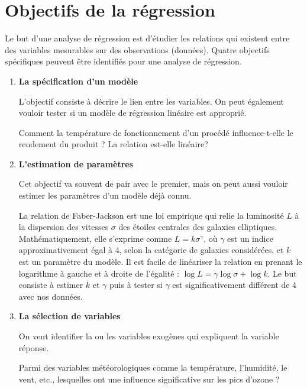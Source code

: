 \section{Objectifs de la régression}

Le but d'une analyse de régression est d'étudier les relations qui existent entre des variables mesurables sur des observations (données). Quatre objectifs spécifiques peuvent être identifiés pour une analyse de régression.

\begin{enumerate}
\item \textbf{La spécification d'un modèle}

L'objectif consiste à décrire le lien entre les variables. On peut également vouloir tester si un modèle de régression linéaire est approprié. 

\begin{exemple}
    Comment la température de fonctionnement d'un procédé influence-t-elle le rendement du produit ? La relation est-elle linéaire?
\end{exemple}


\item \textbf{L'estimation de paramètres}

Cet objectif va souvent de pair avec le premier, mais on peut aussi vouloir estimer les paramètres d'un modèle déjà connu.

\begin{exemple}
    La relation de Faber-Jackson est une loi empirique qui relie la luminosité $L$ à la dispersion des vitesses $\sigma$ des étoiles centrales des galaxies elliptiques. Mathématiquement, elle s'exprime comme $L=k\sigma^\gamma$, où $\gamma$ est un indice approximativement égal à 4, selon la catégorie de galaxies considérées, et $k$ est un paramètre du modèle. Il est facile de linéariser la relation en prenant le logarithme à gauche et à droite de l'égalité : $\log L=\gamma\log\sigma+\log k$. Le but consiste à estimer $k$ et $\gamma$ puis à tester si $\gamma$ est significativement différent de 4 avec nos données.
\end{exemple} 

\item \textbf{La sélection de variables}

On veut identifier la ou les variables exogènes qui expliquent la variable réponse.

\begin{exemple}
    Parmi des variables météorologiques comme la température, l'humidité, le vent, etc., lesquelles ont une influence significative sur les pics d'ozone ?
\end{exemple}


\end{enumerate}
